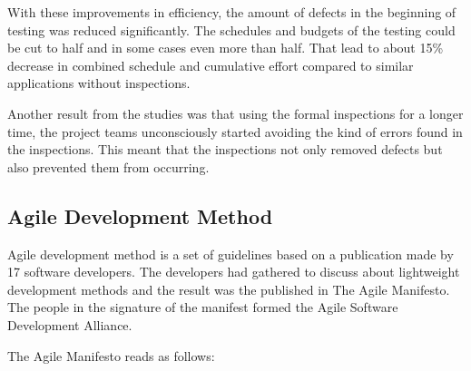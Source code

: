 With these improvements in efficiency, the amount of defects in the beginning of testing was reduced significantly. The schedules and budgets of the testing could be cut to half and in some cases even more than half. That lead to about 15\% decrease in combined schedule and cumulative effort compared to similar applications without inspections.

Another result from the studies was that using the formal inspections for a longer time, the project teams unconsciously started avoiding the kind of errors found in the inspections. This meant that the inspections not only removed defects but also prevented them from occurring.


\subsection{Agile Development Method} 
Agile development method is a set of guidelines based on a publication made by 17 software developers. The developers had gathered to discuss about lightweight development methods and the result was the published in The Agile Manifesto. The people in the signature of the manifest formed the Agile Software Development Alliance.

The Agile Manifesto reads as follows:

